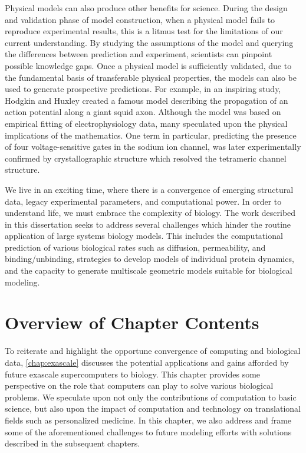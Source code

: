 \par Physical models can also produce other benefits for science.
During the design and validation phase of model construction, when a physical model fails to reproduce experimental results, this is a litmus test for the limitations of our current understanding.
By studying the assumptions of the model and querying the differences between prediction and experiment, scientists can pinpoint possible knowledge gaps.
Once a physical model is sufficiently validated, due to the fundamental basis of transferable physical properties, the models can also be used to generate prospective predictions.
For example, in an inspiring study, Hodgkin and Huxley created a famous model describing the propagation of an action potential along a giant squid axon\cite{HUXLEY1952}.
Although the model was based on empirical fitting of electrophysiology data, many speculated upon the physical implications of the mathematics.
One term in particular, predicting the presence of four voltage-sensitive gates in the sodium ion channel, was later experimentally confirmed by crystallographic structure which resolved the tetrameric channel structure\cite{Sigg2014a}.

\par We live in an exciting time, where there is a convergence of emerging structural data, legacy experimental parameters, and computational power.
In order to understand life, we must embrace the complexity of biology.
The work described in this dissertation seeks to address several challenges which hinder the routine application of large systems biology models.
This includes the computational prediction of various biological rates such as diffusion, permeability, and binding/unbinding, strategies to develop models of individual protein dynamics, and the capacity to generate multiscale geometric models suitable for biological modeling.

\section{Overview of Chapter Contents}

\par To reiterate and highlight the opportune convergence of computing and biological data, \cref{chap:exascale} discusses the potential applications and gains afforded by future exascale supercomputers to biology.
This chapter provides some perspective on the role that computers can play to solve various biological problems.
We speculate upon not only the contributions of computation to basic science, but also upon the impact of computation and technology on translational fields such as personalized medicine.
In this chapter, we also address and frame some of the aforementioned challenges to future modeling efforts with solutions described in the subsequent chapters.

